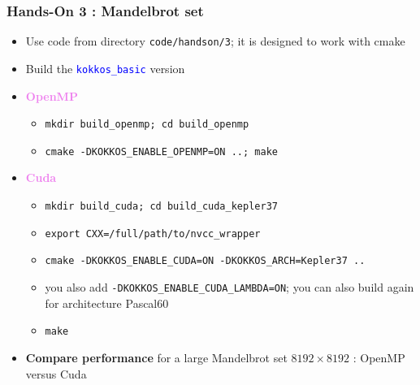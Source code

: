 \begin{frame}[fragile=singleslide]
  \frametitle{Hands-On 3 : Mandelbrot set}

  \begin{itemize}
  \item Use code from directory \texttt{code/handson/3}; it is designed to work with cmake
  \item Build the \textcolor{blue}{\texttt{kokkos\_basic}} version
  \item \textcolor{violet}{\textbf{OpenMP}}
    \begin{itemize}
    \item \texttt{mkdir build\_openmp; cd build\_openmp}
    \item \texttt{cmake -DKOKKOS\_ENABLE\_OPENMP=ON ..; make}
    \end{itemize}
  \item \textcolor{violet}{\textbf{Cuda}}
    \begin{itemize}
    \item \texttt{mkdir build\_cuda; cd build\_cuda\_kepler37}
    \item \texttt{export CXX=/full/path/to/nvcc\_wrapper}
    \item \texttt{cmake -DKOKKOS\_ENABLE\_CUDA=ON -DKOKKOS\_ARCH=Kepler37 ..}
    \item you also add \texttt{-DKOKKOS\_ENABLE\_CUDA\_LAMBDA=ON}; you can also build again for architecture Pascal60
    \item \texttt{make}
    \end{itemize}
  \item \textbf{Compare performance} for a large Mandelbrot set $8192\times 8192$ : OpenMP versus Cuda
  \end{itemize}

\end{frame}
  

